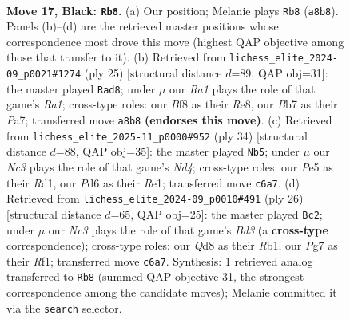 \documentclass[11pt]{article}
\begin{document}
\clearpage

\begin{figure}[p]\centering
\begin{subfigure}{0.46\textwidth}\centering
\resizebox{\linewidth}{!}{%
\newchessgame
\chessboard[
  setfen={r2q1b2/1bp1rppk/p1np4/1p1Bp2p/4P3/P2P1N1P/1PPBRPP1/RQ3K2 b - - 1 17},
  showmover=false,
  pgfstyle=straightmove, color=movearrow, markmove={a8-b8}
]}
\caption{}
\end{subfigure}\hfill
\begin{subfigure}{0.46\textwidth}\centering
\resizebox{\linewidth}{!}{%
\newchessgame
\chessboard[
  setfen={r3r1k1/pppbqpp1/2nb3p/1B2p3/P7/2PPBN1P/2P2PP1/R2QR1K1 b - - 2 13},
  showmover=false,
  pgfstyle=straightmove, color=movearrow, markmove={a8-d8}
]}
\caption{}
\end{subfigure}
\\[4pt]
\begin{subfigure}{0.46\textwidth}\centering
\resizebox{\linewidth}{!}{%
\newchessgame
\chessboard[
  setfen={r2qr1k1/1bp2p1p/1p1p2p1/p1n1b3/2PNP3/1P2BPP1/P1Q3BP/3RR1K1 w - - 1 18},
  showmover=false,
  pgfstyle=straightmove, color=movearrow, markmove={d4-b5}
]}
\caption{}
\end{subfigure}\hfill
\begin{subfigure}{0.46\textwidth}\centering
\resizebox{\linewidth}{!}{%
\newchessgame
\chessboard[
  setfen={r1bq1rk1/4ppbp/2pp2p1/2n5/p1P1P3/2NB3P/PP1BQPP1/1R3RK1 w - - 2 14},
  showmover=false,
  pgfstyle=straightmove, color=movearrow, markmove={d3-c2}
]}
\caption{}
\end{subfigure}
\caption{\textbf{Move 17, Black: \texttt{Rb8}.} (a) Our position; Melanie plays \texttt{Rb8} (\texttt{a8b8}). Panels (b)--(d) are the retrieved master positions whose correspondence most drove this move (highest QAP objective among those that transfer to it). (b) Retrieved from \texttt{lichess\_elite\_2024-09\_p0021\#1274} (ply 25) [structural distance $d$=89, QAP obj=31]: the master played \texttt{Rad8}; under $\mu$ our \emph{Ra1} plays the role of that game's \emph{Ra1}; cross-type roles: our \emph{B}f8 as their \emph{R}e8, our \emph{B}b7 as their \emph{P}a7; transferred move \texttt{a8b8} \textbf{(endorses this move)}. (c) Retrieved from \texttt{lichess\_elite\_2025-11\_p0000\#952} (ply 34) [structural distance $d$=88, QAP obj=35]: the master played \texttt{Nb5}; under $\mu$ our \emph{Nc3} plays the role of that game's \emph{Nd4}; cross-type roles: our \emph{P}e5 as their \emph{R}d1, our \emph{P}d6 as their \emph{R}e1; transferred move \texttt{c6a7}. (d) Retrieved from \texttt{lichess\_elite\_2024-09\_p0010\#491} (ply 26) [structural distance $d$=65, QAP obj=25]: the master played \texttt{Bc2}; under $\mu$ our \emph{Nc3} plays the role of that game's \emph{Bd3} (a \textbf{cross-type} correspondence); cross-type roles: our \emph{Q}d8 as their \emph{R}b1, our \emph{P}g7 as their \emph{R}f1; transferred move \texttt{c6a7}. Synthesis: 1 retrieved analog transferred to \texttt{Rb8} (summed QAP objective 31, the strongest correspondence among the candidate moves); Melanie committed it via the \texttt{search} selector.}
\label{fig:thought-m33}
\end{figure}
\end{document}
